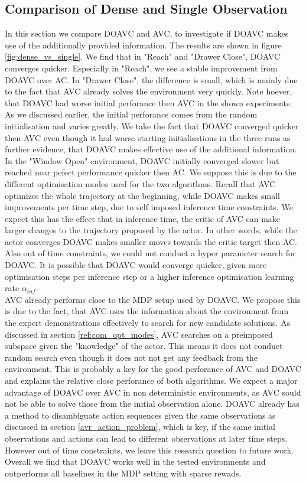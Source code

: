 \subsection{Comparison of Dense and Single Observation}
In this section we compare DOAVC and AVC, to investigate if DOAVC makes use of the additionally provided information. The results are shown in figure \ref{fig:dense_vs_single}.
We find that in "Reach" and "Drawer Close", DOAVC converges quicker. Especially in "Reach", we see a stable improvement from DOAVC over AC. In "Drawer Close", the difference is 
small, which is mainly due to the fact that AVC already solves the environment very quickly. Note hoever, that DOAVC had worse initial perforance then AVC in the shown experiments. 
As we discussed earlier, the initial perforance comes from the random initialisation and varies greatly. We take the fact that DOAVC converged quicker then AVC even though it had 
worse starting initialisations in the three runs as further evidence, that DOAVC makes effective use of the additional information. In the "Window Open" environment, DOAVC initially converged slower but 
reached near pefect performance quicker then AC. We suppose this is due to the different optimisation modes used for the two algorithms. Recall that AVC optimizes the whole 
trajectory at the beginning, while DOAVC makes small improvements per time step, due to self imposed inference time constraints. We expect this has the effect that in inference time, the critic of 
AVC can make larger changes to the trajectory proposed by the actor. In other words, while the actor converges DOAVC makes smaller moves towards the critic target then AC. Also out of time constraints, we could 
not conduct a hyper parameter search for DOAVC. It is possible that DOAVC would converge quicker, given more optimisation steps per inference step or a higher inference optimisation 
learning rate $\alpha_{inf}$.\\ 
AVC already performs close to the MDP setup used by DOAVC. We propose this is due to the fact, that AVC uses the information about the environment 
from the expert demonstrations effectively to search for new candidate solutions. As discussed in section \ref{ref:com_opt_modes}, AVC searches on a preimposed subspace given the "knowledge" of the 
actor. This means it does not conduct random search even though it does not not get any feedback from the environment. This is probably a key for the good perforance of AVC and DOAVC and explains 
the relative close perforance of both algorithms. We expect a major advantage of DOAVC over AVC in non deterministic environments, as AVC sould not be able to solve those from the initial 
observation alone. DOAVC already has a method to disambiguate action sequences given the same observations as discussed in section \ref{avr_action_problem}, which is key, if the same initial 
observations and actions can lead to different observations at later time steps. However out of time constraints, we leave this research question to future work.\\
Overall we find that DOAVC works well in the tested environments and outperforms all baselines in the MDP setting with sparse rewads.

